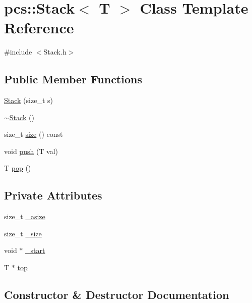 \hypertarget{classpcs_1_1Stack}{}\section{pcs\+:\+:Stack$<$ T $>$ Class Template Reference}
\label{classpcs_1_1Stack}


{\ttfamily \#include $<$Stack.\+h$>$}

\subsection*{Public Member Functions}
\begin{DoxyCompactItemize}
\item 
\hyperlink{classpcs_1_1Stack_aab449874d2c7ff66a258f42e67344bcc}{Stack} (size\+\_\+t s)
\item 
\hyperlink{classpcs_1_1Stack_a11dba3346cd62b56de0d9657ad309b7e}{$\sim$\+Stack} ()
\item 
size\+\_\+t \hyperlink{classpcs_1_1Stack_a2fce467a9c332e07f96c80b0a44f4e38}{size} () const
\item 
void \hyperlink{classpcs_1_1Stack_a413b5e02be11f9290ae1167345a4cf86}{push} (T val)
\item 
T \hyperlink{classpcs_1_1Stack_a8ef82fe8c94663b393b69f1ded8f975b}{pop} ()
\end{DoxyCompactItemize}
\subsection*{Private Attributes}
\begin{DoxyCompactItemize}
\item 
size\+\_\+t \hyperlink{classpcs_1_1Stack_a8da2375da9dbb328c762ba840ba0b29c}{\+\_\+asize}
\item 
size\+\_\+t \hyperlink{classpcs_1_1Stack_a064acf31b252beb9c49983c31b5fc668}{\+\_\+size}
\item 
void $\ast$ \hyperlink{classpcs_1_1Stack_af6cd160aa4460d364627b09467c19b0b}{\+\_\+start}
\item 
T $\ast$ \hyperlink{classpcs_1_1Stack_a8aa862072c58e84468001f177edb80cb}{top}
\end{DoxyCompactItemize}


\subsection{Constructor \& Destructor Documentation}
\mbox{\label{classpcs_1_1Stack_aab449874d2c7ff66a258f42e67344bcc}} 
